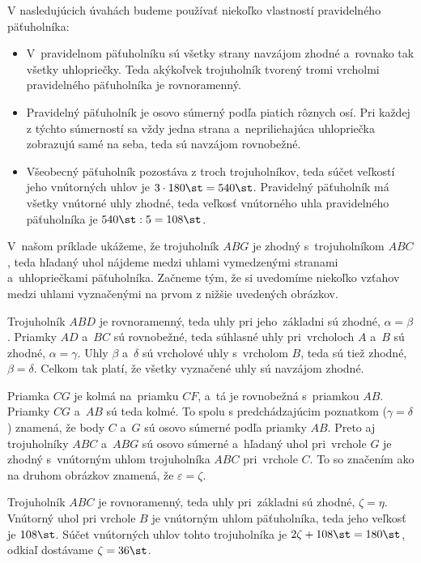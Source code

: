 {%
V nasledujúcich úvahách budeme používať niekoľko vlastností pravidelného päťuholníka:
\begin{itemize}
  \item V~pravidelnom päťuholníku sú všetky strany navzájom zhodné a~rovnako tak všetky uhlopriečky.
  Teda akýkoľvek trojuholník tvorený tromi vrcholmi pravidelného päťuholníka je rovnoramenný.
  \item Pravidelný päťuholník je osovo súmerný podľa piatich rôznych osí.
  Pri každej z týchto súmerností sa vždy jedna strana a~nepriliehajúca uhlopriečka zobrazujú samé na seba, teda sú navzájom rovnobežné.
  \item Všeobecný päťuholník pozostáva z troch trojuholníkov, teda súčet veľkostí jeho vnútorných uhlov je $3\cdot180\st=540\st$.
  Pravidelný päťuholník má všetky vnútorné uhly zhodné, teda veľkosť vnútorného uhla pravidelného päťuholníka je $540\st:5=108\st$.
\end{itemize}

V~našom príklade ukážeme, že trojuholník $ABG$ je zhodný s~trojuholníkom $ABC$, teda hľadaný uhol nájdeme medzi uhlami vymedzenými stranami a~uhlopriečkami päťuholníka.
Začneme tým, že si uvedomíme niekoľko vzťahov medzi uhlami vyznačenými na prvom z nižšie uvedených obrázkov.

Trojuholník $ABD$ je rovnoramenný, teda uhly pri jeho~základni sú zhodné, $\alpha=\beta$.
Priamky $AD$ a~$BC$ sú rovnobežné, teda súhlasné uhly pri~vrcholoch $A$ a~$B$ sú zhodné, $\alpha=\gamma$.
Uhly $\beta$ a~$\delta$ sú vrcholové uhly s~vrcholom $B$, teda sú tiež zhodné, $\beta=\delta$.
Celkom tak platí, že všetky vyznačené uhly sú navzájom zhodné.

Priamka $CG$ je kolmá na~priamku $CF$, a~tá je rovnobežná s~priamkou $AB$.
Priamky $CG$ a~$AB$ sú teda kolmé.
To spolu s predchádzajúcim poznatkom ($\gamma=\delta$) znamená, že body $C$ a~$G$ sú osovo súmerné podľa priamky $AB$.
Preto aj trojuholníky $ABC$ a~$ABG$ sú osovo súmerné a~hľadaný uhol pri~vrchole $G$ je zhodný s~vnútorným uhlom trojuholníka $ABC$ pri~vrchole $C$.
To so značením ako na druhom obrázkov znamená, že $\varepsilon=\zeta$.
%

Trojuholník $ABC$ je rovnoramenný, teda uhly pri~základni sú zhodné, $\zeta=\eta$.
Vnútorný uhol pri vrchole $B$ je vnútorným uhlom päťuholníka, teda jeho veľkosť je $108\st$.
Súčet vnútorných uhlov tohto trojuholníka je $2\zeta+108\st =180\st$, odkiaľ dostávame $\zeta=36\st$.

}
